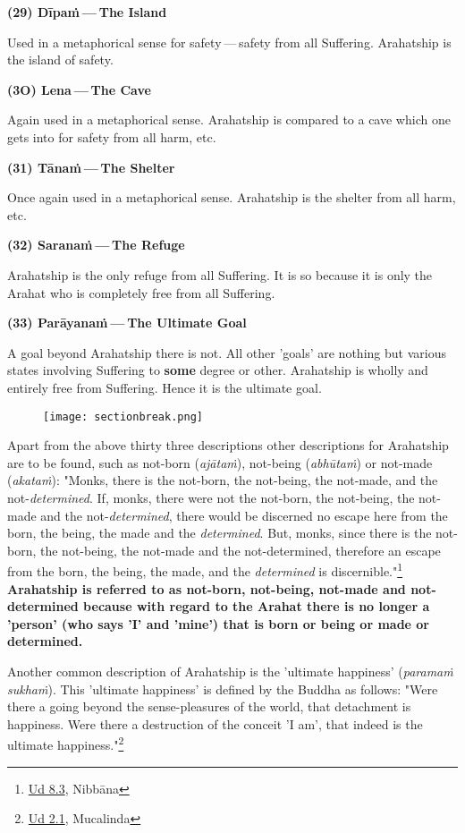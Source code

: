 \textbf{(29) Dīpaṁ — The Island}


Used in a metaphorical sense for safety — safety from all Suffering.
Arahatship is the island of safety.


\textbf{(3O) Lena — The Cave}


Again used in a metaphorical sense. Arahatship is compared to a cave
which one gets into for safety from all harm, etc.


\textbf{(31) Tānaṁ — The Shelter}


Once again used in a metaphorical sense. Arahatship is the shelter from
all harm, etc.


\textbf{(32) Saranaṁ — The Refuge}


Arahatship is the only refuge from all Suffering. It is so because it is
only the Arahat who is completely free from all Suffering.


\textbf{(33) Parāyanaṁ — The Ultimate Goal}


A goal beyond Arahatship there is not. All other 'goals' are nothing but
various states involving Suffering to \textbf{some} degree or other. Arahatship
is wholly and entirely free from Suffering. Hence it is the ultimate
goal.


\begin{figure}[h]{}
\centering\texttt{[image: sectionbreak.png]}


\end{figure}

Apart from the above thirty three descriptions other descriptions for
Arahatship are to be found, such as not-born (\emph{ajātaṁ}), not-being
(\emph{abhūtaṁ}) or not-made (\emph{akataṁ}): "Monks, there is the not-born,
the not-being, the not-made, and the not-\emph{determined}. If, monks,
there were not the not-born, the not-being, the not-made and the
not-\emph{determined}, there would be discerned no escape here from the
born, the being, the made and the \emph{determined}. But, monks, since
there is the not-born, the not-being, the not-made and the
not-determined, therefore an escape from the born, the being, the made,
and the \emph{determined} is discernible."\footnote{\href{https://suttacentral.net/ud8.3/en/anandajoti}{Ud 8.3}, Nibbāna}
\textbf{Arahatship is referred to as not-born, not-being,
not-made and not-determined because with regard to the Arahat there is
no longer a 'person' (who says 'I' and 'mine') that is born or being or
made or determined.}


Another common description of Arahatship is the 'ultimate happiness'
(\emph{paramaṁ sukhaṁ}). This 'ultimate happiness' is defined by the Buddha
as follows: "Were there a going beyond the sense-pleasures of the world,
that detachment is happiness. Were there a destruction of the conceit 'I
am', that indeed is the ultimate happiness."\footnote{\href{https://suttacentral.net/ud2.1/en/anandajoti}{Ud 2.1}, Mucalinda}


